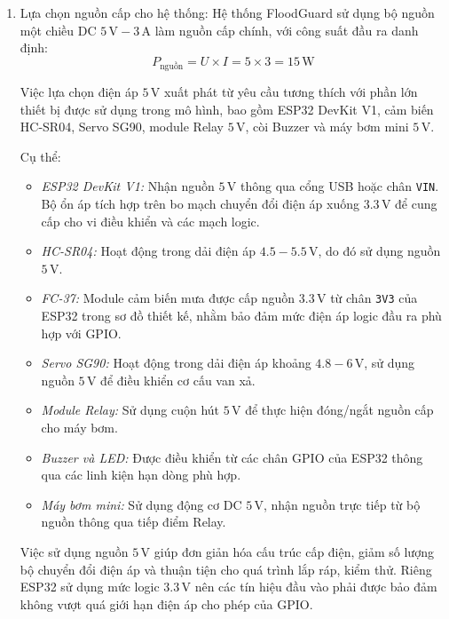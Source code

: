 \begin{enumerate}
    \item Lựa chọn nguồn cấp cho hệ thống:
    Hệ thống FloodGuard sử dụng bộ nguồn một chiều DC $5\,\text{V} - 3\,\text{A}$ làm nguồn cấp chính, với công suất đầu ra danh định:
    \begin{equation}
        P_{\text{nguồn}} = U \times I = 5 \times 3 = 15\,\text{W}
    \end{equation}

    Việc lựa chọn điện áp $5\,\text{V}$ xuất phát từ yêu cầu tương thích với phần lớn thiết bị được sử dụng trong mô hình, bao gồm ESP32 DevKit V1, cảm biến HC-SR04, Servo SG90, module Relay $5\,\text{V}$, còi Buzzer và máy bơm mini $5\,\text{V}$.

    Cụ thể:
    \begin{itemize}
        \item \textit{ESP32 DevKit V1:} Nhận nguồn $5\,\text{V}$ thông qua cổng USB hoặc chân \texttt{VIN}. Bộ ổn áp tích hợp trên bo mạch chuyển đổi điện áp xuống $3.3\,\text{V}$ để cung cấp cho vi điều khiển và các mạch logic.
        \item \textit{HC-SR04:} Hoạt động trong dải điện áp $4.5 - 5.5\,\text{V}$, do đó sử dụng nguồn $5\,\text{V}$.
        \item \textit{FC-37:} Module cảm biến mưa được cấp nguồn $3.3\,\text{V}$ từ chân \texttt{3V3} của ESP32 trong sơ đồ thiết kế, nhằm bảo đảm mức điện áp logic đầu ra phù hợp với GPIO.
        \item \textit{Servo SG90:} Hoạt động trong dải điện áp khoảng $4.8 - 6\,\text{V}$, sử dụng nguồn $5\,\text{V}$ để điều khiển cơ cấu van xả.
        \item \textit{Module Relay:} Sử dụng cuộn hút $5\,\text{V}$ để thực hiện đóng/ngắt nguồn cấp cho máy bơm.
        \item \textit{Buzzer và LED:} Được điều khiển từ các chân GPIO của ESP32 thông qua các linh kiện hạn dòng phù hợp.
        \item \textit{Máy bơm mini:} Sử dụng động cơ DC $5\,\text{V}$, nhận nguồn trực tiếp từ bộ nguồn thông qua tiếp điểm Relay.
    \end{itemize}

    Việc sử dụng nguồn $5\,\text{V}$ giúp đơn giản hóa cấu trúc cấp điện, giảm số lượng bộ chuyển đổi điện áp và thuận tiện cho quá trình lắp ráp, kiểm thử. Riêng ESP32 sử dụng mức logic $3.3\,\text{V}$ nên các tín hiệu đầu vào phải được bảo đảm không vượt quá giới hạn điện áp cho phép của GPIO.


\end{enumerate}
